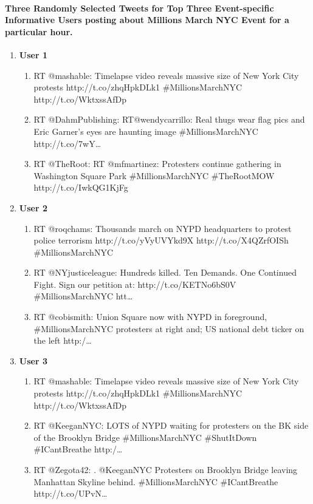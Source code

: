 \paragraph{Three Randomly Selected Tweets for Top Three Event-specific Informative Users posting about Millions March NYC Event for a particular hour.}
\begin{enumerate}
\item \textbf{User 1}
\begin{enumerate}
\item RT @mashable: Timelapse video reveals massive size of New York City protests http://t.co/zhqHpkDLk1 \#MillionsMarchNYC http://t.co/WktxssAfDp
\item RT @DahmPublishing: RT@wendycarrillo: Real thugs wear flag pics and Eric Garner's eyes are haunting image \#MillionsMarchNYC http://t.co/7wY…
\item RT @TheRoot: RT @mfmartinez: Protesters continue gathering in Washington Square Park \#MillionsMarchNYC \#TheRootMOW http://t.co/IwkQG1KjFg
\end{enumerate}

\item \textbf{User 2}
\begin{enumerate}
\item RT @roqchams: Thousands march on NYPD headquarters to protest police terrorism http://t.co/yVyUVYkd9X http://t.co/X4QZrfOISh \#MillionsMarchNYC
\item RT @NYjusticeleague: Hundreds killed. Ten Demands. One Continued Fight.  Sign our petition at: http://t.co/KETNo6bS0V \#MillionsMarchNYC htt…
\item RT @cobismith: Union Square now with NYPD in foreground, \#MillionsMarchNYC protesters at right and; US national debt ticker on the left http:/…
\end{enumerate}

\item \textbf{User 3}
\begin{enumerate}
\item RT @mashable: Timelapse video reveals massive size of New York City protests http://t.co/zhqHpkDLk1 \#MillionsMarchNYC http://t.co/WktxssAfDp
\item RT @KeeganNYC: LOTS of NYPD waiting for protesters on the BK side of the Brooklyn Bridge \#MillionsMarchNYC \#ShutItDown \#ICantBreathe http:/…
\item RT @Zegota42: . @KeeganNYC Protesters on Brooklyn Bridge leaving Manhattan Skyline behind. \#MillionsMarchNYC \#ICantBreathe http://t.co/UPvN…
\end{enumerate}

\end{enumerate}


